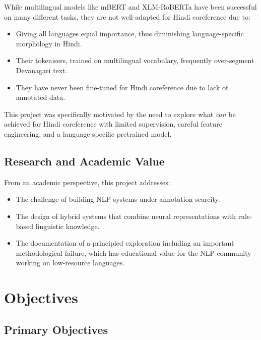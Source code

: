\documentclass[12pt,a4paper]{report}
\begin{document}
While multilingual models like mBERT and XLM-RoBERTa have been successful on many
different tasks, they are not well-adapted for Hindi coreference due to: 
\begin{itemize}
    \item Giving all languages equal importance, thus diminishing language-specific morphology in Hindi.
    \item Their tokenisers, trained on multilingual vocabulary, frequently over-segment Devanagari text.
    \item They have never been fine-tuned for Hindi coreference due to lack of annotated data.
\end{itemize}

This project was specifically motivated by the need to explore what \textit{can} be achieved for Hindi coreference with limited supervision, careful feature engineering, and a language-specific pretrained model.

\subsection{Research and Academic Value}

From an academic perspective, this project addresses:
\begin{itemize}
    \item The challenge of building NLP systems under annotation scarcity.
    \item The design of hybrid systems that combine neural representations with rule-based linguistic knowledge.
    \item The documentation of a principled exploration including an important methodological failure, which has educational value for the NLP community working on low-resource languages.
\end{itemize}

\section{Objectives}

\subsection{Primary Objectives}
\end{document}
